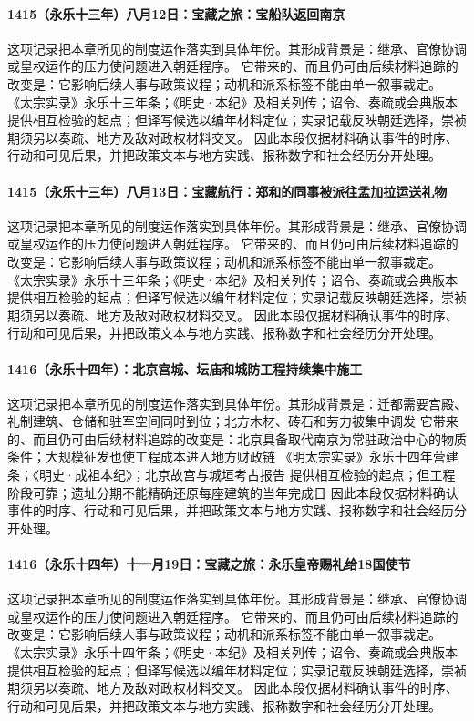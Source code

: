 \paragraph{1415（永乐十三年）八月12日：宝藏之旅：宝船队返回南京} 这项记录把本章所见的制度运作落实到具体年份。其形成背景是：继承、官僚协调或皇权运作的压力使问题进入朝廷程序。 它带来的、而且仍可由后续材料追踪的改变是：它影响后续人事与政策议程；动机和派系标签不能由单一叙事裁定。 《太宗实录》永乐十三年条；《明史·本纪》及相关列传；诏令、奏疏或会典版本 提供相互检验的起点；但译写候选以编年材料定位；实录记载反映朝廷选择，崇祯期须另以奏疏、地方及敌对政权材料交叉。 因此本段仅据材料确认事件的时序、行动和可见后果，并把政策文本与地方实践、报称数字和社会经历分开处理。

\paragraph{1415（永乐十三年）八月13日：宝藏航行：郑和的同事被派往孟加拉运送礼物} 这项记录把本章所见的制度运作落实到具体年份。其形成背景是：继承、官僚协调或皇权运作的压力使问题进入朝廷程序。 它带来的、而且仍可由后续材料追踪的改变是：它影响后续人事与政策议程；动机和派系标签不能由单一叙事裁定。 《太宗实录》永乐十三年条；《明史·本纪》及相关列传；诏令、奏疏或会典版本 提供相互检验的起点；但译写候选以编年材料定位；实录记载反映朝廷选择，崇祯期须另以奏疏、地方及敌对政权材料交叉。 因此本段仅据材料确认事件的时序、行动和可见后果，并把政策文本与地方实践、报称数字和社会经历分开处理。

\paragraph{1416（永乐十四年）：北京宫城、坛庙和城防工程持续集中施工} 这项记录把本章所见的制度运作落实到具体年份。其形成背景是：迁都需要宫殿、礼制建筑、仓储和驻军空间同时到位；北方木材、砖石和劳力被集中调发 它带来的、而且仍可由后续材料追踪的改变是：北京具备取代南京为常驻政治中心的物质条件；大规模征发也使工程成本进入地方财政链 《明太宗实录》永乐十四年营建条；《明史·成祖本纪》；北京故宫与城垣考古报告 提供相互检验的起点；但工程阶段可靠；遗址分期不能精确还原每座建筑的当年完成日 因此本段仅据材料确认事件的时序、行动和可见后果，并把政策文本与地方实践、报称数字和社会经历分开处理。

\paragraph{1416（永乐十四年）十一月19日：宝藏之旅：永乐皇帝赐礼给18国使节} 这项记录把本章所见的制度运作落实到具体年份。其形成背景是：继承、官僚协调或皇权运作的压力使问题进入朝廷程序。 它带来的、而且仍可由后续材料追踪的改变是：它影响后续人事与政策议程；动机和派系标签不能由单一叙事裁定。 《太宗实录》永乐十四年条；《明史·本纪》及相关列传；诏令、奏疏或会典版本 提供相互检验的起点；但译写候选以编年材料定位；实录记载反映朝廷选择，崇祯期须另以奏疏、地方及敌对政权材料交叉。 因此本段仅据材料确认事件的时序、行动和可见后果，并把政策文本与地方实践、报称数字和社会经历分开处理。

